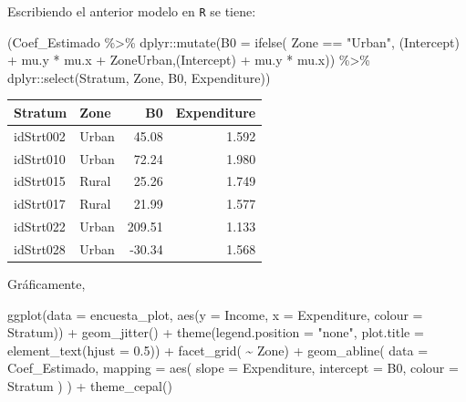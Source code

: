 \documentclass[
  12pt,
]{book}
\newenvironment{Shaded}{\begin{snugshade}}{\end{snugshade}}
\newcommand{\AttributeTok}[1]{\textcolor[rgb]{0.77,0.63,0.00}{#1}}
\newcommand{\FloatTok}[1]{\textcolor[rgb]{0.00,0.00,0.81}{#1}}
\newcommand{\FunctionTok}[1]{\textcolor[rgb]{0.00,0.00,0.00}{#1}}
\newcommand{\NormalTok}[1]{#1}
\newcommand{\SpecialCharTok}[1]{\textcolor[rgb]{0.00,0.00,0.00}{#1}}
\newcommand{\StringTok}[1]{\textcolor[rgb]{0.31,0.60,0.02}{#1}}
\begin{document}
Escribiendo el anterior modelo en \texttt{R} se tiene:

\begin{Shaded}
\begin{Highlighting}[]
\NormalTok{(Coef\_Estimado }\SpecialCharTok{\%\textgreater{}\%}\NormalTok{  dplyr}\SpecialCharTok{::}\FunctionTok{mutate}\NormalTok{(}\AttributeTok{B0 =} \FunctionTok{ifelse}\NormalTok{( Zone }\SpecialCharTok{==} \StringTok{"Urban"}\NormalTok{, }\StringTok{\textasciigrave{}}\AttributeTok{(Intercept)}\StringTok{\textasciigrave{}} \SpecialCharTok{+}\NormalTok{ mu.y }\SpecialCharTok{*}\NormalTok{ mu.x }\SpecialCharTok{+}\NormalTok{ ZoneUrban,}\StringTok{\textasciigrave{}}\AttributeTok{(Intercept)}\StringTok{\textasciigrave{}} \SpecialCharTok{+}\NormalTok{ mu.y }\SpecialCharTok{*}\NormalTok{ mu.x)) }\SpecialCharTok{\%\textgreater{}\%}
\NormalTok{  dplyr}\SpecialCharTok{::}\FunctionTok{select}\NormalTok{(Stratum, Zone, B0, Expenditure))}
\end{Highlighting}
\end{Shaded}

\begin{tabular}{l|l|r|r}
\hline
Stratum & Zone & B0 & Expenditure\\
\hline
idStrt002 & Urban & 45.08 & 1.592\\
\hline
idStrt010 & Urban & 72.24 & 1.980\\
\hline
idStrt015 & Rural & 25.26 & 1.749\\
\hline
idStrt017 & Rural & 21.99 & 1.577\\
\hline
idStrt022 & Urban & 209.51 & 1.133\\
\hline
idStrt028 & Urban & -30.34 & 1.568\\
\hline
\end{tabular}

Gráficamente,

\begin{Shaded}
\begin{Highlighting}[]
\FunctionTok{ggplot}\NormalTok{(}\AttributeTok{data =}\NormalTok{ encuesta\_plot,}
       \FunctionTok{aes}\NormalTok{(}\AttributeTok{y =}\NormalTok{ Income, }\AttributeTok{x =}\NormalTok{ Expenditure,}
           \AttributeTok{colour =}\NormalTok{ Stratum)) }\SpecialCharTok{+}
  \FunctionTok{geom\_jitter}\NormalTok{() }\SpecialCharTok{+}
  \FunctionTok{theme}\NormalTok{(}\AttributeTok{legend.position =} \StringTok{"none"}\NormalTok{,}
        \AttributeTok{plot.title =} \FunctionTok{element\_text}\NormalTok{(}\AttributeTok{hjust =} \FloatTok{0.5}\NormalTok{)) }\SpecialCharTok{+}
  \FunctionTok{facet\_grid}\NormalTok{( }\SpecialCharTok{\textasciitilde{}}\NormalTok{ Zone) }\SpecialCharTok{+}
  \FunctionTok{geom\_abline}\NormalTok{(}
    \AttributeTok{data =}\NormalTok{ Coef\_Estimado,}
    \AttributeTok{mapping =} \FunctionTok{aes}\NormalTok{(}
      \AttributeTok{slope =}\NormalTok{ Expenditure,}
      \AttributeTok{intercept =}\NormalTok{ B0,}
      \AttributeTok{colour =}\NormalTok{ Stratum}
\NormalTok{    )}
\NormalTok{  ) }\SpecialCharTok{+}
  \FunctionTok{theme\_cepal}\NormalTok{()}
\end{Highlighting}
\end{Shaded}
\end{document}
